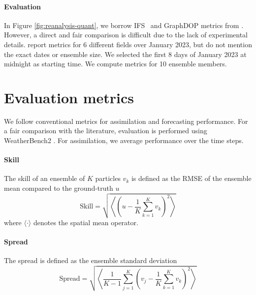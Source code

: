 \begin{subappendices}
\paragraph{Evaluation}
In Figure \ref{fig:reanalysis-quant}, we borrow IFS~\cite{ecmwf2020ifs} and GraphDOP \cite{alexe2024graphdop} metrics from \textcite{alexe2024graphdop}. However, a direct and fair comparison is difficult due to the lack of experimental details. \textcite{alexe2024graphdop} report metrics for 6 different fields over January 2023, but do not mention the exact dates or ensemble size. We selected the first 8 days of January 2023 at midnight as starting time. We compute metrics for 10 ensemble members.

\section{Evaluation metrics}

We follow conventional metrics for assimilation and forecasting performance. For a fair comparison with the literature, evaluation is performed using WeatherBench2 \cite{rasp2024weatherbench}. For assimilation, we average performance over the time steps.

\paragraph{Skill}
The skill \cite{fortin2014why, price2025probabilistic} of an ensemble of $K$ particles $v_k$ is defined as the RMSE of the ensemble mean compared to the ground-truth $u$
\begin{equation}
    \text{Skill} = \sqrt{\left\langle \left( u - \frac{1}{K} \sum_{k=1}^K v_k \right)^2 \right\rangle}
\end{equation}
where $\langle \cdot \rangle$ denotes the spatial mean operator.

\paragraph{Spread} The spread \cite{fortin2014why, price2025probabilistic} is defined as the ensemble standard deviation
\begin{equation}
    \text{Spread} = \sqrt{\left\langle \frac{1}{K - 1} \sum_{j=1}^K \left( v_j - \frac{1}{K} \sum_{k=1}^K v_k \right)^2 \right\rangle}
\end{equation}


\end{subappendices}
